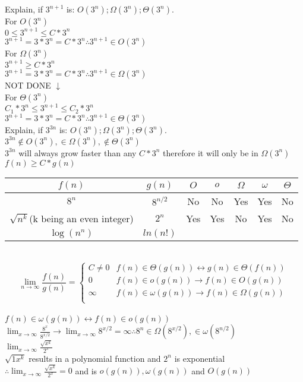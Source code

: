 \documentclass[12pt,largemargins]{homework}
\date{Septemeber 6, 2018}
\begin{document}
\maketitle
\question
Explain, if $3^{n + 1}$ is: $ O(3^n ) ; \Omega ( 3^n ) ; \Theta ( 3^n ) $.\\
For $O(3^n)$\\
$ 0\leq 3^{n+1} \leq C*3^n$\\
$3^{n+1} = 3*3^n = C * 3^n \therefore 3^{n+1} \in O(3^n)$\\
For $\Omega (3^n)$\\
$3^{n+1} \geq C*3^n$\\
$3^{n+1} = 3*3^n = C * 3^n \therefore 3^{n+1} \in \Omega(3^n)$\\
NOT DONE $\downarrow$\\
For $\Theta (3^n)$\\
$C_1 * 3^n \leq 3^{n+1} \leq C_2*3^n$\\
$3^{n+1} = 3*3^n = C * 3^n \therefore 3^{n+1} \in \Theta(3^n)$\\

\question
Explain, if $3^{3 n}$ is: $ O ( 3^n ) ; \Omega ( 3^n ) ; \Theta ( 3^n ).$\\
$3^{3n} \notin O(3^n), \in \Omega(3^n), \notin \Theta(3^n)$\\
$3^{3n}$ will always grow faster than any $C * 3^n$ therefore it will only be in $\Omega(3^n)$ $f(n)\geq C*g(n)$\\
\question
\begin{tabular}{|c|c|c|c|c|c|c|}
\hline
$f(n)$&$g(n)$&$O$&$o$&$\Omega$&$\omega$&$\Theta$\\
\hline
$8^n$&$8^{n/2}$&No&No&Yes&Yes&No\\
\hline
$\sqrt{n^k} $(k being an even integer)$ $&$2^n$&Yes& Yes&No&Yes&No\\
\hline
$\log(n^n)$&$ln(n!)$\\
\hline
\end{tabular}\\
$$\lim_{n\to\infty}\frac{f(n)}{g(n)}=
\begin{cases} 
      C \neq 0 & f(n) \in \Theta(g(n)) \leftrightarrow g(n) \in \Theta(f(n))\\
      0 & f(n) \in o(g(n)) \rightarrow f(n) \in O(g(n))\\
      \infty & f(n) \in \omega(g(n)) \rightarrow f(n) \in \Omega(g(n))\\
   \end{cases}
\,$$\\
$f(n) \in \omega(g(n)) \leftrightarrow f(n) \in o(g(n))$\\
$\lim_{x\to\infty}\frac{8^x}{8^{x/2}}\rightarrow\lim_{x\to\infty}8^{x/2}=\infty\therefore 8^n \in \Omega (8^{x/2}), \in \omega(8^{n/2})$\\
$\lim_{x\to\infty} \frac{\sqrt{x^k}}{2^x}$\\
$\sqrt{1x^k}$ results in a polynomial function and $2^n$ is exponential\\
$\therefore \lim_{x\to\infty} \frac{\sqrt{x^k}}{2^x} = 0$ and is $o(g(n)), \omega (g(n))$ and $O(g(n))$\\
\end{document}
